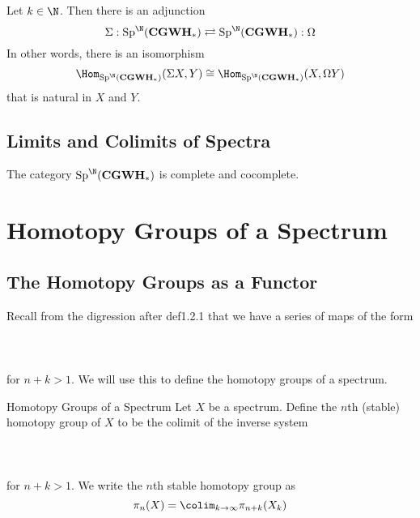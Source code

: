 \documentclass[a4paper]{article}
\begin{document}
\begin{prp}{}{} Let $k\in\N$. Then there is an adjunction $$\Sigma:\text{Sp}^\N(\bold{CGWH}_\ast)\rightleftarrows\text{Sp}^\N(\bold{CGWH}_\ast):\Omega$$ In other words, there is an isomorphism $$\Hom_\bold{\text{Sp}^\N(\bold{CGWH}_\ast)}(\Sigma X,Y)\cong\Hom_{\text{Sp}^\N(\bold{CGWH}_\ast)}(X,\Omega Y)$$ that is natural in $X$ and $Y$. 
\end{prp}

\subsection{Limits and Colimits of Spectra}
\begin{prp}{}{} The category $\text{Sp}^\N(\bold{CGWH}_\ast)$ is complete and cocomplete. 
\end{prp}

\pagebreak
\section{Homotopy Groups of a Spectrum}
\subsection{The Homotopy Groups as a Functor}
Recall from the digression after def1.2.1 that we have a series of maps of the form \\~\\
\\~\\
for $n+k>1$. We will use this to define the homotopy groups of a spectrum. 

\begin{defn}{Homotopy Groups of a Spectrum}{} Let $X$ be a spectrum. Define the $n$th (stable) homotopy group of $X$ to be the colimit of the inverse system \\~\\
\\~\\
for $n+k>1$. We write the $n$th stable homotopy group as $$\pi_n(X)=\colim_{k\to\infty}\pi_{n+k}(X_k)$$
\end{defn}
\end{document}
